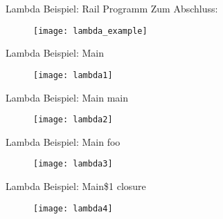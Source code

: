 \begin{frame}[fragile]{Lambda Beispiel: Rail Programm }
Zum Abschluss:
\begin{figure}[htp]
\begin{center}
\texttt{[image: lambda\_example]}
\end{center}
\end{figure}
\end{frame}

\begin{frame}[fragile]{Lambda Beispiel: Main }
\begin{figure}[htp]
\begin{center}
\texttt{[image: lambda1]}
\end{center}
\end{figure}
\end{frame}

\begin{frame}[fragile]{Lambda Beispiel: Main main }
\begin{figure}[htp]
\begin{center}
\texttt{[image: lambda2]}
\end{center}
\end{figure}
\end{frame}

\begin{frame}[fragile]{Lambda Beispiel: Main foo }
\begin{figure}[htp]
\begin{center}
\texttt{[image: lambda3]}
\end{center}
\end{figure}
\end{frame}

\begin{frame}[fragile]{Lambda Beispiel: Main\$1 closure}
\begin{figure}[htp]
\begin{center}
\texttt{[image: lambda4]}
\end{center}
\end{figure}
\end{frame}